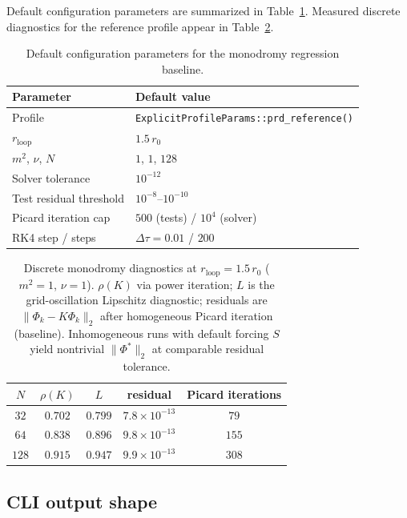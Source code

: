 \documentclass[preprint,12pt,a4paper]{elsarticle}
\begin{document}
Default configuration parameters are summarized in Table~\ref{tab:params}.
Measured discrete diagnostics for the reference profile appear in Table~\ref{tab:monodromy}.

\begin{table}[H]
\centering
\caption{Default configuration parameters for the monodromy regression baseline.}
\label{tab:params}
\begin{tabular}{@{}ll@{}}
\toprule
Parameter & Default value \\
\midrule
Profile & \texttt{ExplicitProfileParams::prd\_reference()} \\
$r_{\mathrm{loop}}$ & $1.5\,r_{0}$ \\
$m^{2}$, $\nu$, $N$ & $1$, $1$, $128$ \\
Solver tolerance & $10^{-12}$ \\
Test residual threshold & $10^{-8}$--$10^{-10}$ \\
Picard iteration cap & $500$ (tests) / $10^{4}$ (solver) \\
RK4 step / steps & $\Delta\tau=0.01$ / $200$ \\
\bottomrule
\end{tabular}
\end{table}

\begin{table}[H]
\centering
\caption{Discrete monodromy diagnostics at $r_{\mathrm{loop}}=1.5\,r_{0}$ ($m^{2}=1$, $\nu=1$).
$\rho(K)$ via power iteration; $L$ is the grid-oscillation Lipschitz diagnostic; residuals are $\|\Phi_{k}-K\Phi_{k}\|_{2}$ after homogeneous Picard iteration (baseline). Inhomogeneous runs with default forcing $S$ yield nontrivial $\|\Phi^{*}\|_{2}$ at comparable residual tolerance.}
\label{tab:monodromy}
\begin{tabular}{@{}ccccc@{}}
\toprule
$N$ & $\rho(K)$ & $L$ & residual & Picard iterations \\
\midrule
$32$ & $0.702$ & $0.799$ & $7.8\times 10^{-13}$ & $79$ \\
$64$ & $0.838$ & $0.896$ & $9.8\times 10^{-13}$ & $155$ \\
$128$ & $0.915$ & $0.947$ & $9.9\times 10^{-13}$ & $308$ \\
\bottomrule
\end{tabular}
\end{table}

\subsection{CLI output shape}
\end{document}
